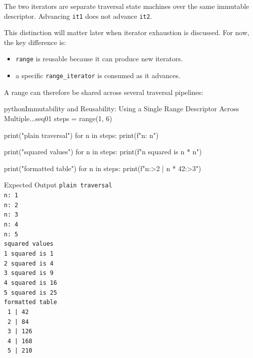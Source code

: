 The two iterators are separate traversal state machines over the same immutable descriptor. Advancing \texttt{it1} does not advance \texttt{it2}.

This distinction will matter later when iterator exhaustion is discussed. For now, the key difference is:

\begin{itemize}
    \item \texttt{range} is reusable because it can produce new iterators.
    \item a specific \texttt{range\_iterator} is consumed as it advances.
\end{itemize}

A range can therefore be shared across several traversal pipelines:

\begin{codebox}[]{python}{Immutability and Reusability: Using a Single Range Descriptor Across Multiple...}{seq01}
steps = range(1, 6)

print("plain traversal")
for n in steps:
    print(f"n: {n}")

print("squared values")
for n in steps:
    print(f"{n} squared is {n * n}")

print("formatted table")
for n in steps:
    print(f"{n:>2} | {n * 42:>3}")
\end{codebox}


\begin{iobox}{Expected Output}
\texttt{plain traversal} \\
\texttt{n: 1} \\
\texttt{n: 2} \\
\texttt{n: 3} \\
\texttt{n: 4} \\
\texttt{n: 5} \\
\texttt{squared values} \\
\texttt{1 squared is 1} \\
\texttt{2 squared is 4} \\
\texttt{3 squared is 9} \\
\texttt{4 squared is 16} \\
\texttt{5 squared is 25} \\
\texttt{formatted table} \\
\texttt{ 1 |  42} \\
\texttt{ 2 |  84} \\
\texttt{ 3 | 126} \\
\texttt{ 4 | 168} \\
\texttt{ 5 | 210} \\
\end{iobox}


